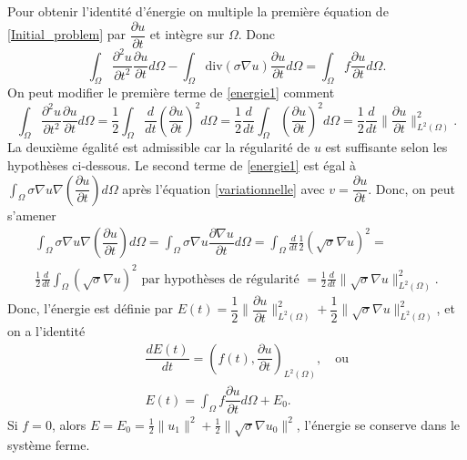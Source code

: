 \documentclass[12pt]{article}
\newcommand{\pd}[2]{ %
	\dfrac{\partial #1}{\partial #2}
}
\begin{document}
Pour obtenir l'identité d'énergie on multiple la première équation de   \eqref{Initial_problem} par $\pd{u}{t}$ et intègre sur $\Omega$. Donc
\begin{equation}
\label{energie1}
	\int_\Omega{\dfrac{\partial^2u}{\partial t^2} \pd{u}{t} d\Omega} - \int_\Omega{\text{div}(\sigma \nabla u)\pd{u}{t} d\Omega} = \int_\Omega{f \pd{u}{t} d\Omega}.
\end{equation}
On peut modifier le première terme de \eqref{energie1} comment
\begin{equation}
	\int_\Omega{\dfrac{\partial^2u}{\partial t^2} \pd{u}{t} d\Omega}= \frac{1}{2}\int_\Omega{\frac{d}{dt}(\pd{u}{t})^2d\Omega} = \frac{1}{2}\frac{d}{dt}\int_\Omega{(\pd{u}{t})^2d\Omega} = \frac{1}{2}\frac{d}{dt}\|\pd{u}{t}\|^2_{L^2(\Omega)}.
\end{equation}
La deuxième égalité est admissible car la régularité de $u$ est suffisante selon les hypothèses ci-dessous.
Le second terme de \eqref{energie1} est égal à $\int_\Omega{\sigma \nabla u \nabla(\pd{u}{t}) d\Omega}$ après l'équation \eqref{variationnelle} avec $v = \pd{u}{t}$. Donc, on peut s'amener 
\begin{multline}
	\int_\Omega{\sigma \nabla u \nabla(\pd{u}{t}) d\Omega} = \int_\Omega{\sigma \nabla u\pd{\nabla u}{t} d\Omega} = \int_{\Omega}{\frac{d}{dt}\frac{1}{2}(\sqrt{\sigma}\nabla u)^2} =\\ \frac{1}{2}\frac{d}{dt}\int_{\Omega}{(\sqrt{\sigma}\nabla u)^2} \text{ par hypothèses de régularité }
	= \frac{1}{2}\frac{d}{dt}\|\sqrt{\sigma}\nabla u\|^2_{L^2(\Omega)}.
\end{multline}
Donc, l'énergie est définie par $E(t) = \dfrac{1}{2}\|\pd{u}{t}\|^2_{L^2(\Omega)} + \dfrac{1}{2}\|\sqrt{\sigma}\nabla u\|^2_{L^2(\Omega)}$, et on a l'identité
\begin{eqnarray}
& &\dfrac{d E(t)}{dt} = (f(t),\pd{u}{t})_{L^2(\Omega)}, \quad\text{ou} \\[2mm]
& &E(t) = \int_\Omega{f \pd{u}{t}d\Omega} + E_0.
\end{eqnarray}
Si $f = 0$, alors $E = E_0 = \frac{1}{2}\|u_1\|^2 + \frac{1}{2}\|\sqrt{\sigma}\nabla u_0\|^2$, l'énergie se conserve dans le système ferme.
\end{document}
